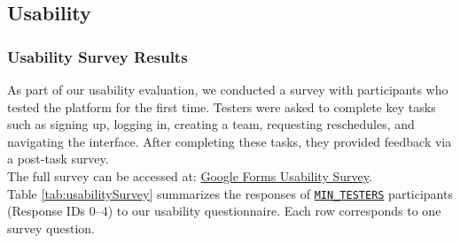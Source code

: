 \documentclass[12pt, titlepage]{article}
\begin{document}
\subsection{Usability}

\subsubsection{Usability Survey Results}

As part of our usability evaluation, we conducted a survey with participants who tested the platform for the first time. Testers were asked to complete key tasks such as signing up, logging in, creating a team, requesting reschedules, and navigating the interface. After completing these tasks, they provided feedback via a post-task survey.\\

The full survey can be accessed at:  
\href{https://docs.google.com/forms/d/e/1FAIpQLSeJ6XQhV2XkQ3CwSQN0GmwiXQIoUg9fHRQ2i7hpc-1skot2jQ/viewform}{Google Forms Usability Survey}.\\


Table \ref{tab:usabilitySurvey} summarizes the responses of \hyperref[MIN_TESTERS]{\texttt{MIN\_TESTERS}} participants (Response IDs 0--4) to our usability questionnaire. Each row corresponds to one survey question.
\end{document}
